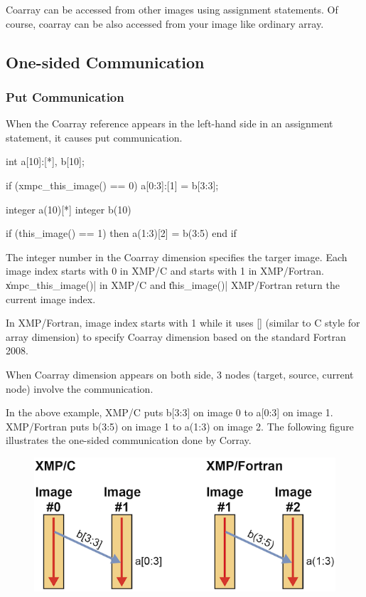 Coarray can be accessed from other images using assignment
statements. Of course, coarray can be also accessed from your image like
ordinary array.

\subsection{One-sided Communication}

\subsubsection{Put Communication}

When the Coarray reference appears in the left-hand side in an
assignment statement, it causes put communication.

\begin{XCexample}
int a[10]:[*], b[10];

if (xmpc_this_image() == 0)
  a[0:3]:[1] = b[3:3];
\end{XCexample}

\begin{XFexample}
integer a(10)[*]
integer b(10)

if (this_image() == 1) then
  a(1:3)[2] = b(3:5)
end if
\end{XFexample}

The integer number in the Coarray dimension specifies the targer
image. Each image index starts with 0 in XMP/C and starts with 1 in
XMP/Fortran. \|xmpc_this_image()| in XMP/C and \|this_image()| XMP/Fortran
return the current image index.

\begin{mynote}
In XMP/Fortran, image index starts with 1 while it
uses [] (similar to C 
style for array dimension) to specify Coarray dimension based on the
standard Fortran 2008.
\end{mynote}

\begin{mynote}
When Coarray dimension appears on both side, 3
nodes (target, source, current node) involve the communication.
\end{mynote}

In the above example, XMP/C puts b[3:3] on image 0 to a[0:3] on image
1. XMP/Fortran puts b(3:5) on image 1 to a(1:3) on image 2. The
following figure illustrates the one-sided communication done by
Corray.

\begin{figure}
  \centering
  \includegraphics{figs/put.png}
\end{figure}


